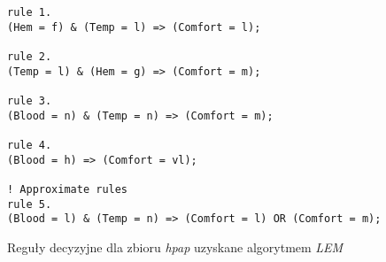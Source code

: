 \begin{figure}
\begin{verbatim}
rule 1.
(Hem = f) & (Temp = l) => (Comfort = l);

rule 2.
(Temp = l) & (Hem = g) => (Comfort = m);

rule 3.
(Blood = n) & (Temp = n) => (Comfort = m);

rule 4.
(Blood = h) => (Comfort = vl);

! Approximate rules
rule 5.
(Blood = l) & (Temp = n) => (Comfort = l) OR (Comfort = m);
\end{verbatim}
\caption{Reguły decyzyjne dla zbioru \emph{hpap} uzyskane algorytmem \emph{LEM}}
\label{p2t2-hpap-rules}
\end{figure}

